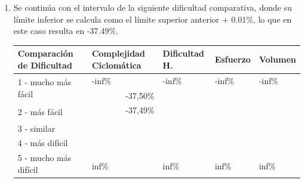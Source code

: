 \documentclass[letterpaper,12pt]{article}
\begin{document}
\begin{enumerate}
\begin{table}[H]
          \label{tab:base-int-table-1}
        \end{table}
  \item Se continúa con el intervalo de la siguiente dificultad comparativa, donde su límite inferior se calcula como el límite superior anterior + 0.01\%, lo que en este caso resulta en -37.49\%.
        \begin{table}[H]
          \centering
          \begin{tabular}{|l|l|l|l|l|}
            \hline
            \textbf{Comparación de Dificultad}     & \textbf{Complejidad Ciclomática} & \textbf{Dificultad H.} & \textbf{Esfuerzo} & \textbf{Volumen} \\ \hline
            \multirow{2}{*}{1 - mucho más fácil}   & -inf\%                           & -inf\%                 & -inf\%            & -inf\%           \\ \cline{2-5}
                                                   & \multicolumn{1}{r|}{-37,50\%}    &                        &                   &                  \\ \hline
            \multirow{2}{*}{2 - más fácil}         & \multicolumn{1}{r|}{-37,49\%}    &                        &                   &                  \\ \cline{2-5}
                                                   & \multicolumn{1}{r|}{}            &                        &                   &                  \\ \hline
            \multirow{2}{*}{3 - similar}           & \multicolumn{1}{r|}{}            &                        &                   &                  \\ \cline{2-5}
                                                   & \multicolumn{1}{r|}{}            &                        &                   &                  \\ \hline
            \multirow{2}{*}{4 - más difícil}       &                                  &                        &                   &                  \\ \cline{2-5}
                                                   &                                  &                        &                   &                  \\ \hline
            \multirow{2}{*}{5 - mucho más difícil} &                                  &                        &                   &                  \\ \cline{2-5}
                                                   & inf\%                            & inf\%                  & inf\%             & inf\%            \\ \hline

\end{tabular}
\end{table}
\end{enumerate}
\end{document}

